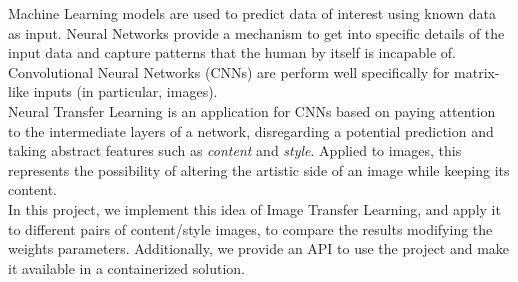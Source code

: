 \begin{center}
    \begin{minipage}{0.85\textwidth}
        Machine Learning models are used to predict data of interest using known data as input.
        Neural Networks provide a mechanism to get into specific details of the input data and capture patterns that the human by itself is incapable of.
        Convolutional Neural Networks (CNNs) are perform well specifically for matrix-like inputs (in particular, images).\\
        Neural Transfer Learning is an application for CNNs based on paying attention to the intermediate layers
        of a network, disregarding a potential prediction and taking abstract features such as \emph{content} and \emph{style}.
        Applied to images, this represents the possibility of altering the artistic side of an image while keeping its content.\\
        In this project, we implement this idea of Image Transfer Learning, and apply it to different pairs of content/style images,
        to compare the results modifying the weights parameters.
        Additionally, we provide an API to use the project and make it available in a containerized solution.
    \end{minipage}
\end{center}